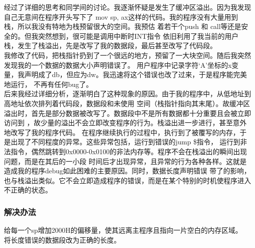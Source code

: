 \documentclass[a4paper]{article}
\newcommand{\codev}[1]{\textsf{#1}}
\begin{document}
    经过了详细的思考和同学间的讨论。我逐渐怀疑是发生了缓冲区溢出。因为我发现自己无意间在程序开头写下了
    \codev{mov sp, ax}这样的代码。我的程序没有大量用到栈，所以我没有特地为栈预留很大的空间。我预估
    着若干个\codev{push} 和 \codev{call}等还是安全的。但我突然想到，很可能是调用中断时INT指令
    依旧利用了我当前的用户栈，发生了栈溢出，先是改写了我的数据段，最后甚至改写了代码段。\\
    
    我修改了代码，把栈指针扔到了一个很远的地方，预留了一大块空间。随后我突然发现我的一个数据的数据大小声明错误了。
    用户程序中记录字符`A'坐标的x变量，我声明成了db，但应为dw。我迅速将这个错误也改了过来，于是程序能完美地运行，
    不再有任何bug了。 \\
    
    后来我经过详细分析，逐渐明白了这种现象的原因。由于我的程序中，从低地址到高地址依次排列着代码段，数据段和未使用
    空间（栈指针指向其末尾）。故缓冲区溢出时，首先是部分数据被改写了。数据段中不是所有数据都十分重要且会被立即访问到
    ，故少量的溢出不会立即改变程序的行为。栈溢出进一步进行，甚至意外地改写了我的程序代码。
    在程序继续执行的过程中，执行到了被覆写的内存，于是出现了不同程度的异常。这些异常包括，运行到错误的jump \$指令，
    运行到非法指令，偶然跳转到0x0000-0x0100的非法内存等。程序不会在栈溢出的瞬间出现问题，而是在其后的一小段
    时间后才出现异常，且异常的行为各种各样。这就是造成我的程序debug如此困难的主要原因。同时，数据长度声明错误
    带了的影响，也与栈溢出类似。它不会立即造成程序的错误，而是在某个特别的时机使程序进入不正确的状态。
    \subsubsection{解决办法}
    给每一个sp增加2000H的偏移量，使其远离主程序且指向一片空白的内存区域。\\
    
    将长度错误的数据段改为正确的长度。
        
\end{document}
